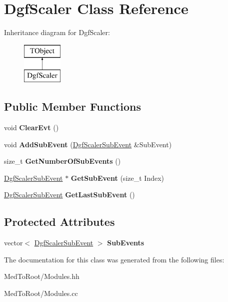 \hypertarget{class_dgf_scaler}{}\section{Dgf\+Scaler Class Reference}
\label{class_dgf_scaler}
Inheritance diagram for Dgf\+Scaler\+:\begin{figure}[H]
\begin{center}
\leavevmode
\includegraphics[height=2.000000cm]{class_dgf_scaler}
\end{center}
\end{figure}
\subsection*{Public Member Functions}
\begin{DoxyCompactItemize}
\item 
\mbox{\label{class_dgf_scaler_a379aef078983f0664a92af66b0ef595d}} 
void {\bfseries Clear\+Evt} ()
\item 
\mbox{\label{class_dgf_scaler_a620d4a4dc60fd0a2608bfeb32329780e}} 
void {\bfseries Add\+Sub\+Event} (\hyperlink{class_dgf_scaler_sub_event}{Dgf\+Scaler\+Sub\+Event} \&Sub\+Event)
\item 
\mbox{\label{class_dgf_scaler_a1ffa8daad855bc1abda26fa647add076}} 
size\+\_\+t {\bfseries Get\+Number\+Of\+Sub\+Events} ()
\item 
\mbox{\label{class_dgf_scaler_a115de3afca80d77ba524de5da88f6214}} 
\hyperlink{class_dgf_scaler_sub_event}{Dgf\+Scaler\+Sub\+Event} $\ast$ {\bfseries Get\+Sub\+Event} (size\+\_\+t Index)
\item 
\mbox{\label{class_dgf_scaler_a055a0de3e930c7ff88eede1adb74a52e}} 
\hyperlink{class_dgf_scaler_sub_event}{Dgf\+Scaler\+Sub\+Event} {\bfseries Get\+Last\+Sub\+Event} ()
\end{DoxyCompactItemize}
\subsection*{Protected Attributes}
\begin{DoxyCompactItemize}
\item 
\mbox{\label{class_dgf_scaler_a867e6953afa484ee4b7ca8ec204a1fa1}} 
vector$<$ \hyperlink{class_dgf_scaler_sub_event}{Dgf\+Scaler\+Sub\+Event} $>$ {\bfseries Sub\+Events}
\end{DoxyCompactItemize}


The documentation for this class was generated from the following files\+:\begin{DoxyCompactItemize}
\item 
Med\+To\+Root/Modules.\+hh\item 
Med\+To\+Root/Modules.\+cc\end{DoxyCompactItemize}
